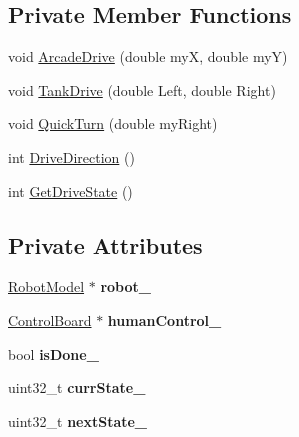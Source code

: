 \subsection*{Private Member Functions}
\begin{DoxyCompactItemize}
\item 
void \hyperlink{class_drive_controller_a59d4b701fd83e101a3aaf9726fc626dd}{Arcade\+Drive} (double myX, double myY)
\item 
void \hyperlink{class_drive_controller_a93ed2c0196329dcbd6dd666f609ef487}{Tank\+Drive} (double Left, double Right)
\item 
void \hyperlink{class_drive_controller_a3e9f778228ea2812b372fbb43fdf5a08}{Quick\+Turn} (double my\+Right)
\item 
int \hyperlink{class_drive_controller_aeecbfd3643cadb19cc30af0f22c41c98}{Drive\+Direction} ()
\item 
int \hyperlink{class_drive_controller_a001ab748cefcfdb9d4aa10b3cf699d53}{Get\+Drive\+State} ()
\end{DoxyCompactItemize}
\subsection*{Private Attributes}
\begin{DoxyCompactItemize}
\item 
\mbox{\label{class_drive_controller_abc5ee587234574826c58a259902fa86f}} 
\hyperlink{class_robot_model}{Robot\+Model} $\ast$ {\bfseries robot\+\_\+}
\item 
\mbox{\label{class_drive_controller_af9b33cc9fd301b54d3cdb31223d8216a}} 
\hyperlink{class_control_board}{Control\+Board} $\ast$ {\bfseries human\+Control\+\_\+}
\item 
\mbox{\label{class_drive_controller_ad71cbf0f66adf918dba524662867775f}} 
bool {\bfseries is\+Done\+\_\+}
\item 
\mbox{\label{class_drive_controller_ac8e6cfbda24abc7c033e6ec9c2f75f13}} 
uint32\+\_\+t {\bfseries curr\+State\+\_\+}
\item 
\mbox{\label{class_drive_controller_abc8e83a004bdf2edd3b76aeb7d5b66d2}} 
uint32\+\_\+t {\bfseries next\+State\+\_\+}
\end{DoxyCompactItemize}



